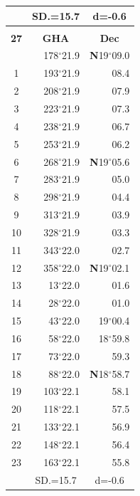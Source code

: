 \documentclass[10pt, a4paper]{report}
\begin{document}
\begin{scriptsize}
\begin{tabular*}{0.2\textwidth}[t]{@{\extracolsep{\fill}}|c|rr|}
\hline
\rule{0pt}{2.4ex} & \multicolumn{1}{c}{SD.=15.7} & \multicolumn{1}{c|}{d=-0.6}\\
\hline
\multicolumn{1}{c}{}\\[-0.5ex]\hline
\multicolumn{1}{|c|}{\rule{0pt}{2.6ex}\textbf{27}} & \multicolumn{1}{c}{\textbf{GHA}} & \multicolumn{1}{c|}{\textbf{Dec}}\\
\hline\rule{0pt}{2.6ex}\noindent
0 & 178$^\circ$21.9 & \textbf{N}19$^\circ$09.0\\
1 & 193$^\circ$21.9 & 08.4\\
2 & 208$^\circ$21.9 & 07.9\\
3 & 223$^\circ$21.9 & \raisebox{0.24ex}{\boldmath$\cdot$~\boldmath$\cdot$~~}07.3\\
4 & 238$^\circ$21.9 & 06.7\\
5 & 253$^\circ$21.9 & 06.2\\[2Pt]
6 & 268$^\circ$21.9 & \textbf{N}19$^\circ$05.6\\
7 & 283$^\circ$21.9 & 05.0\\
8 & 298$^\circ$21.9 & 04.4\\
9 & 313$^\circ$21.9 & \raisebox{0.24ex}{\boldmath$\cdot$~\boldmath$\cdot$~~}03.9\\
10 & 328$^\circ$21.9 & 03.3\\
11 & 343$^\circ$22.0 & 02.7\\[2Pt]
12 & 358$^\circ$22.0 & \textbf{N}19$^\circ$02.1\\
13 & 13$^\circ$22.0 & 01.6\\
14 & 28$^\circ$22.0 & 01.0\\
15 & 43$^\circ$22.0 & 19$^\circ$00.4\\
16 & 58$^\circ$22.0 & 18$^\circ$59.8\\
17 & 73$^\circ$22.0 & 59.3\\[2Pt]
18 & 88$^\circ$22.0 & \textbf{N}18$^\circ$58.7\\
19 & 103$^\circ$22.1 & 58.1\\
20 & 118$^\circ$22.1 & 57.5\\
21 & 133$^\circ$22.1 & \raisebox{0.24ex}{\boldmath$\cdot$~\boldmath$\cdot$~~}56.9\\
22 & 148$^\circ$22.1 & 56.4\\
23 & 163$^\circ$22.1 & 55.8\\
\hline
\rule{0pt}{2.4ex} & \multicolumn{1}{c}{SD.=15.7} & \multicolumn{1}{c|}{d=-0.6}\\
\hline
\end{tabular*}\noindent
\begin{tabular*}{0.2\textwidth}[t]{@{\extracolsep{\fill}}|c|rr|}

\end{tabular*}
\end{scriptsize}
\end{document}
